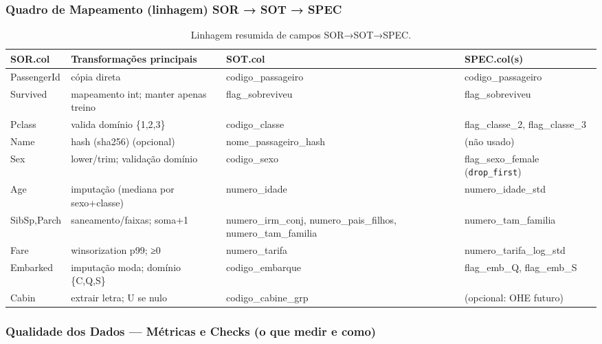 \documentclass[12pt,a4paper]{article}
\begin{document}
\subsubsection*{Quadro de Mapeamento (linhagem) SOR → SOT → SPEC}
\begin{table}[h!]
\centering
\footnotesize
\begin{tabular}{@{}p{3.8cm}p{6cm}p{3.8cm}p{3.8cm}@{}}
\toprule
\textbf{SOR.col} & \textbf{Transformações principais} & \textbf{SOT.col} & \textbf{SPEC.col(s)} \\
\midrule
PassengerId & cópia direta & codigo\_passageiro & codigo\_passageiro \\
Survived & mapeamento int; manter apenas treino & flag\_sobreviveu & flag\_sobreviveu \\
Pclass & valida domínio \{1,2,3\} & codigo\_classe & flag\_classe\_2, flag\_classe\_3 \\
Name & hash (sha256) (opcional) & nome\_passageiro\_hash & (não usado) \\
Sex & lower/trim; validação domínio & codigo\_sexo & flag\_sexo\_female (\texttt{drop\_first}) \\
Age & imputação (mediana por sexo+classe) & numero\_idade & numero\_idade\_std \\
SibSp,Parch & saneamento/faixas; soma+1 & numero\_irm\_conj, numero\_pais\_filhos, numero\_tam\_familia & numero\_tam\_familia \\
Fare & winsorization p99; ≥0 & numero\_tarifa & numero\_tarifa\_log\_std \\
Embarked & imputação moda; domínio \{C,Q,S\} & codigo\_embarque & flag\_emb\_Q, flag\_emb\_S \\
Cabin & extrair letra; U se nulo & codigo\_cabine\_grp & (opcional: OHE futuro) \\
\bottomrule
\end{tabular}
\caption{Linhagem resumida de campos SOR→SOT→SPEC.}
\end{table}

\subsubsection*{Qualidade dos Dados — Métricas e Checks (o que medir e como)}
\end{document}
